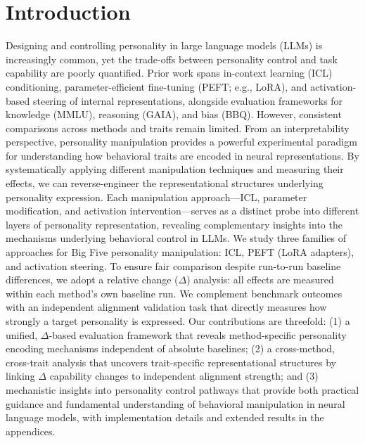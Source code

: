 \section{Introduction}

Designing and controlling personality in large language models (LLMs) is increasingly common, yet the trade-offs between personality control and task capability are poorly quantified. Prior work spans in-context learning (ICL) conditioning, parameter-efficient fine-tuning (PEFT; e.g., LoRA), and activation-based steering of internal representations, alongside evaluation frameworks for knowledge (MMLU), reasoning (GAIA), and bias (BBQ). However, consistent comparisons across methods and traits remain limited. From an interpretability perspective, personality manipulation provides a powerful experimental paradigm for understanding how behavioral traits are encoded in neural representations. By systematically applying different manipulation techniques and measuring their effects, we can reverse-engineer the representational structures underlying personality expression. Each manipulation approach—ICL, parameter modification, and activation intervention—serves as a distinct probe into different layers of personality representation, revealing complementary insights into the mechanisms underlying behavioral control in LLMs. We study three families of approaches for Big Five personality manipulation: ICL, PEFT (LoRA adapters), and activation steering. To ensure fair comparison despite run-to-run baseline differences, we adopt a relative change (\(\Delta\)) analysis: all effects are measured within each method's own baseline run. We complement benchmark outcomes with an independent alignment validation task that directly measures how strongly a target personality is expressed. Our contributions are threefold: (1) a unified, \(\Delta\)-based evaluation framework that reveals method-specific personality encoding mechanisms independent of absolute baselines; (2) a cross-method, cross-trait analysis that uncovers trait-specific representational structures by linking \(\Delta\) capability changes to independent alignment strength; and (3) mechanistic insights into personality control pathways that provide both practical guidance and fundamental understanding of behavioral manipulation in neural language models, with implementation details and extended results in the appendices.